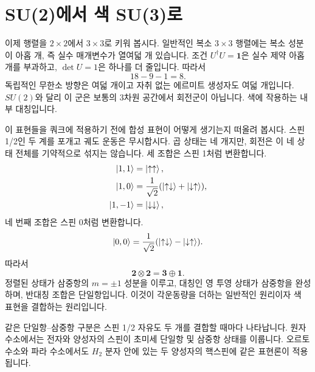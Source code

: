 \section{SU(2)에서 색 SU(3)로}

이제 행렬을 \(2\times2\)에서 \(3\times3\)로 키워 봅시다. 일반적인 복소 \(3\times3\) 행렬에는 복소 성분이 아홉 개, 즉 실수 매개변수가 열여덟 개 있습니다. 조건 \(U^\dagger U=\boldsymbol 1\)은 실수 제약 아홉 개를 부과하고, \(\det U=1\)은 하나를 더 줄입니다. 따라서
\begin{equation}
18-9-1=8.
\end{equation}
독립적인 무한소 방향은 여덟 개이고 자취 없는 에르미트 생성자도 여덟 개입니다. \(SU(2)\)와 달리 이 군은 보통의 3차원 공간에서 회전군이 아닙니다. 색에 작용하는 내부 대칭입니다.

이 표현들을 쿼크에 적용하기 전에 합성 표현이 어떻게 생기는지 떠올려 봅시다. 스핀 1/2인 두 계를 포개고 궤도 운동은 무시합시다. 곱 상태는 네 개지만, 회전은 이 네 상태 전체를 기약적으로 섞지는 않습니다. 세 조합은 스핀 1처럼 변환합니다.
\begin{align}
\left\lvert1,1\right\rangle&=\left\lvert\uparrow\uparrow\right\rangle,\\
\left\lvert1,0\right\rangle&=\frac{1}{\sqrt2}
(\left\lvert\uparrow\downarrow\right\rangle+\left\lvert\downarrow\uparrow\right\rangle),\\
\left\lvert1,-1\right\rangle&=\left\lvert\downarrow\downarrow\right\rangle,
\end{align}
네 번째 조합은 스핀 0처럼 변환합니다.
\begin{equation}
\left\lvert0,0\right\rangle=\frac{1}{\sqrt2}
(\left\lvert\uparrow\downarrow\right\rangle-\left\lvert\downarrow\uparrow\right\rangle).
\end{equation}
따라서
\begin{equation}
\boldsymbol 2\otimes\boldsymbol 2
=\boldsymbol 3\oplus\boldsymbol 1.
\label{eq:l4-two-spin-decomposition}
\end{equation}
정렬된 상태가 삼중항의 \(m=\pm1\) 성분을 이루고, 대칭인 영 투영 상태가 삼중항을 완성하며, 반대칭 조합은 단일항입니다. 이것이 각운동량을 더하는 일반적인 원리이자 색 표현을 결합하는 원리입니다.

같은 단일항--삼중항 구분은 스핀 1/2 자유도 두 개를 결합할 때마다 나타납니다. 원자 수소에서는 전자와 양성자의 스핀이 초미세 단일항 및 삼중항 상태를 이룹니다. 오르토 수소와 파라 수소에서도 \(H_2\) 분자 안에 있는 두 양성자의 핵스핀에 같은 표현론이 적용됩니다.

